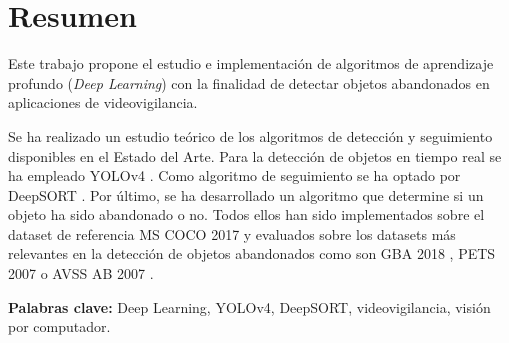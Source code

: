 
\chapter*{Resumen}
\label{cha:resumen}


Este trabajo propone el estudio e implementación de algoritmos de aprendizaje profundo (\textit{Deep Learning}) con la finalidad de detectar objetos abandonados en aplicaciones de videovigilancia.

Se ha realizado un estudio teórico de los algoritmos de detección y seguimiento disponibles en el Estado del Arte. Para la detección de objetos en tiempo real se ha empleado YOLOv4 \cite{bochkovskiy2020yolov4}. Como algoritmo de seguimiento se ha optado por DeepSORT \cite{Wojke2017simple}. Por último, se ha desarrollado un algoritmo que determine si un objeto ha sido abandonado o no. Todos ellos han sido implementados sobre el dataset de referencia MS COCO 2017 \cite{lin2015microsoft} y evaluados sobre los datasets más relevantes en la detección de objetos abandonados como son GBA 2018 \cite{gba-dataset}, PETS 2007 \cite{pets2007-dataset} o AVSS AB 2007 \cite{AVSSAB2007-dataset}.

\textbf{Palabras clave:} Deep Learning, YOLOv4, DeepSORT, videovigilancia, visión por computador.